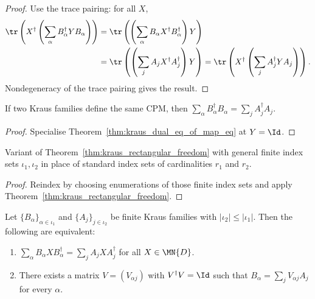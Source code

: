 \begin{proof}
    \leanok
    Use the trace pairing: for all $X$,
    \begin{align}
        \tr\left(X^\dagger
            \left(\sum_\alpha B_\alpha^\dagger Y B_\alpha\right)\right)
        &= \tr\left(\left(\sum_\alpha
            B_\alpha X^\dagger B_\alpha^\dagger\right)Y\right)
        \notag\\
        &= \tr\left(\left(\sum_j
            A_j X^\dagger A_j^\dagger\right)Y\right)
         = \tr\left(X^\dagger
            \left(\sum_j A_j^\dagger Y A_j\right)\right).
        \notag
    \end{align}
    Nondegeneracy of the trace pairing gives the result.
\end{proof}

\begin{theorem}\label{thm:kraus_conjTranspose_mul_eq_of_map_eq}
    \leanok
    If two Kraus families define the same CPM, then
    $\sum_\alpha B_\alpha^\dagger B_\alpha = \sum_j A_j^\dagger A_j$.
\end{theorem}

\begin{proof}
    \leanok
    Specialise Theorem~\ref{thm:kraus_dual_eq_of_map_eq} at $Y = \Id$.
\end{proof}

\begin{theorem}\label{thm:kraus_rectangular_freedom'}
    \leanok
    Variant of Theorem~\ref{thm:kraus_rectangular_freedom} with general
    finite index sets $\iota_1, \iota_2$ in place of standard index sets of
    cardinalities $r_1$ and $r_2$.
\end{theorem}

\begin{proof}
    \leanok
    Reindex by choosing enumerations of those finite index sets and apply
    Theorem~\ref{thm:kraus_rectangular_freedom}.
\end{proof}

\begin{theorem}
    \label{thm:kraus_isometry_freedom_iff}
    \leanok
    Let $\{B_\alpha\}_{\alpha \in \iota_1}$ and $\{A_j\}_{j \in \iota_2}$
    be finite Kraus families with $|\iota_2| \le |\iota_1|$.
    Then the following are equivalent:
    \begin{enumerate}
        \item $\sum_\alpha B_\alpha X B_\alpha^\dagger
                  = \sum_j A_j X A_j^\dagger$ for all $X \in \MN{D}$.
        \item There exists a matrix $V = (V_{\alpha j})$ with
              $V^\dagger V = \Id$ such that
              $B_\alpha = \sum_j V_{\alpha j} A_j$ for every $\alpha$.
    \end{enumerate}
\end{theorem}

